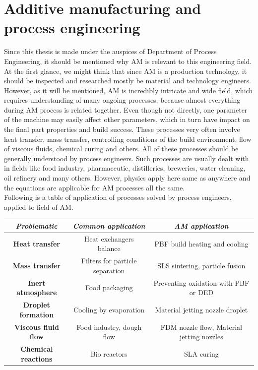 \documentclass[a4paper, twoside, 11pt]{report}
\begin{document}
\section{Additive manufacturing and process engineering}
Since this thesis is made under the auspices of Department of Process Engineering, it should be mentioned why AM is relevant to this engineering field. At the first glance, we might think that since AM is a production technology, it should be inspected and researched mostly be material and technology engineers. However, as it will be mentioned, AM is incredibly intricate and wide field, which requires understanding of many ongoing processes, because almost everything during AM process is related together. Even though not directly, one parameter of the machine may easily affect other parameters, which in turn have impact on the final part properties and build success. These processes very often involve heat transfer, mass transfer, controlling conditions of the build environment, flow of viscous fluids, chemical curing and others. All of these processes should be generally understood by process engineers. Such processes are usually dealt with in fields like food industry, pharmaceutic, distilleries, breweries, water cleaning, oil refinery and many others. However, physics apply here same as anywhere and the equations are applicable for AM processes all the same.\\
Following is a table of application of processes solved by process engineers, applied to field of AM.
\\[10pt]
\begin{tabular}{||c||c||c|}
\hline 
\textit{Problematic} & \textit{Common application} & \textit{AM application} \\ 
\hline 
\textbf{Heat transfer} & Heat exchangers balance & PBF build heating and cooling \\
\hline
\textbf{Mass transfer} & Filters for particle separation & SLS sintering, particle fusion \\ 
\hline 
\textbf{Inert atmosphere} & Food packaging & Preventing oxidation with PBF or DED\\
\hline 
\textbf{Droplet formation} & Cooling by evaporation & Material jetting nozzle droplet \\ 
\hline 
\textbf{Viscous fluid flow} & Food industry, dough flow & FDM nozzle flow, Material jetting nozzles\\ 
\hline 
\textbf{Chemical reactions} & Bio reactors & SLA curing\\ 
\hline 
\end{tabular} 
%
\end{document}
